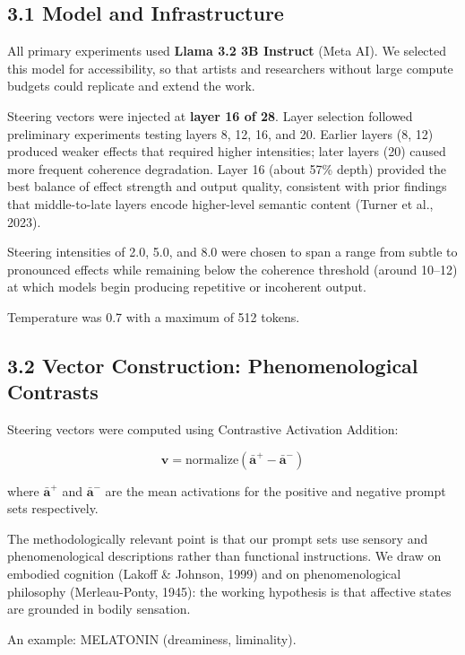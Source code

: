\documentclass[11pt,a4paper]{article}
\begin{document}
\subsection*{3.1 Model and Infrastructure}

All primary experiments used \textbf{Llama 3.2 3B Instruct} (Meta AI). We selected this model for accessibility, so that artists and researchers without large compute budgets could replicate and extend the work.

Steering vectors were injected at \textbf{layer 16 of 28}. Layer selection followed preliminary experiments testing layers 8, 12, 16, and 20. Earlier layers (8, 12) produced weaker effects that required higher intensities; later layers (20) caused more frequent coherence degradation. Layer 16 (about 57\% depth) provided the best balance of effect strength and output quality, consistent with prior findings that middle-to-late layers encode higher-level semantic content (Turner et al., 2023).

Steering intensities of 2.0, 5.0, and 8.0 were chosen to span a range from subtle to pronounced effects while remaining below the coherence threshold (around 10--12) at which models begin producing repetitive or incoherent output.

Temperature was 0.7 with a maximum of 512 tokens.

\subsection*{3.2 Vector Construction: Phenomenological Contrasts}

Steering vectors were computed using Contrastive Activation Addition:

\begin{equation*}
\mathbf{v} = \text{normalize}(\bar{\mathbf{a}}^{+} - \bar{\mathbf{a}}^{-})
\end{equation*}

where $\bar{\mathbf{a}}^{+}$ and $\bar{\mathbf{a}}^{-}$ are the mean activations for the positive and negative prompt sets respectively.

The methodologically relevant point is that our prompt sets use sensory and phenomenological descriptions rather than functional instructions. We draw on embodied cognition (Lakoff \& Johnson, 1999) and on phenomenological philosophy (Merleau-Ponty, 1945): the working hypothesis is that affective states are grounded in bodily sensation.

An example: MELATONIN (dreaminess, liminality).
\end{document}

